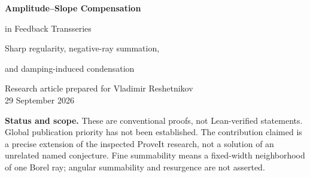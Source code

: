 \documentclass[11pt,a4paper]{article}
\numberwithin{equation}{section}
\theoremstyle{definition}
\theoremstyle{remark}
\theoremstyle{definition}
\newcommand{\U}{\widehat U}
\begin{document}
\begin{center}
{\LARGE\bfseries\color{ink} Amplitude--Slope Compensation\par in Feedback Transseries\par}
\vspace{0.8em}
{\large Sharp regularity, negative-ray summation,\par and damping-induced condensation\par}
\vspace{1em}
Research article prepared for Vladimir Reshetnikov\\
29 September 2026
\end{center}

\begin{abstract}
Consider the formal equation
\[
 \U(q)=\sum_{j\ge1}c_jq^j\exp(\lambda_j\U(q)),\qquad
 c_1=1,\quad 0<c_j\le1,\quad\lambda_j\ge0,
\]
and let $d_j=\log(1/c_j)$. We prove that its solution converges precisely
when $\lambda_j=O(j+d_j)$. For every $s>0$, the solution and its
compositional inverse are Gevrey--$s$ precisely when
\[
 \lambda_j^{1/(s+1)}=O\bigl(j\log(j+1)+d_j\bigr).
\]
The same condition characterizes a uniform Gevrey--$s$ expansion of the
literal inverse on a closed left half-disc. At $s=1$ it is also equivalent
to fine Borel--Laplace summability of both series in the negative direction;
the sums are inverse functions and satisfy the original convergent kernel.
Under strong damping, $d_j/(j\log(j+1))\to\infty$, the exact
factorial-normalized type is
\[
 T_s(\U)=(s+1)^{s+1}\limsup_{j\to\infty}
                          \frac{\lambda_j}{d_j^{s+1}}.
\]
For $d_j\sim b j^\beta$, $\lambda_j\sim a j^p$, $p>\beta>1$, the type
is an actual coefficient-root limit, and the dominant action has size
$((p/\beta)n/b)^{1/\beta}$ in probability. These results answer the
repository's weighted-amplitude question for positive, exponentially
bounded amplitudes. The package includes exact finite verification,
a rational inverse certificate, numerical diagnostics, and further
research questions.
\end{abstract}

\noindent\textbf{Status and scope.} These are conventional proofs, not
Lean-verified statements. Global publication priority has not been established.
The contribution claimed is a precise extension of the inspected ProveIt
research, not a solution of an unrelated named conjecture. Fine summability
means a fixed-width neighborhood of one Borel ray; angular summability and
resurgence are not asserted.
\end{document}
